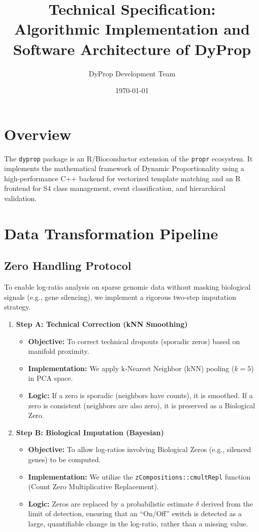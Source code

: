 \documentclass[11pt, a4paper]{article}
\title{\textbf{Technical Specification: Algorithmic Implementation and Software Architecture of DyProp}}
\author{DyProp Development Team}
\date{\today}
\begin{document}
\maketitle

\section{Overview}
The \texttt{dyprop} package is an R/Bioconductor extension of the \texttt{propr} ecosystem. It implements the mathematical framework of Dynamic Proportionality using a high-performance C++ backend for vectorized template matching and an R frontend for S4 class management, event classification, and hierarchical validation.

\section{Data Transformation Pipeline}

\subsection{Zero Handling Protocol}
To enable log-ratio analysis on sparse genomic data without masking biological signals (e.g., gene silencing), we implement a rigorous two-step imputation strategy.

\begin{enumerate}
    \item \textbf{Step A: Technical Correction (kNN Smoothing)}
    \begin{itemize}
        \item \textbf{Objective:} To correct technical dropouts (sporadic zeros) based on manifold proximity.
        \item \textbf{Implementation:} We apply k-Nearest Neighbor (kNN) pooling ($k=5$) in PCA space.
        \item \textbf{Logic:} If a zero is sporadic (neighbors have counts), it is smoothed. If a zero is consistent (neighbors are also zero), it is preserved as a Biological Zero.
    \end{itemize}
    
    \item \textbf{Step B: Biological Imputation (Bayesian)}
    \begin{itemize}
        \item \textbf{Objective:} To allow log-ratios involving Biological Zeros (e.g., silenced genes) to be computed.
        \item \textbf{Implementation:} We utilize the \texttt{zCompositions::cmultRepl} function (Count Zero Multiplicative Replacement).
        \item \textbf{Logic:} Zeros are replaced by a probabilistic estimate $\delta$ derived from the limit of detection, ensuring that an ``On/Off'' switch is detected as a large, quantifiable change in the log-ratio, rather than a missing value.
    \end{itemize}
\end{enumerate}
\end{document}
